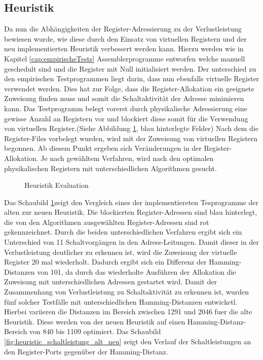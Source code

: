 \subsection{Heuristik}
\label{chap:eval_heuristik}
Da nun die Abhängigkeiten der Register-Adressierung zu der Verlustleistung bewiesen wurde, wie diese durch den Einsatz von virtuellen Registern und der neu implementierten Heuristik verbessert werden kann. Hierzu werden wie in Kapitel \ref{cap:empirischeTests} Assemblerprogramme entworfen welche manuell geschedult sind und die Register mit Null initialisiert werden. Der unterschied zu den empirischen Testprogrammen liegt darin, dass nun ebenfalls virtuelle Register verwendet werden.
Dies hat zur Folge, dass die Register-Allokation ein geeignete Zuweisung finden muss und somit die Schaltaktivität der Adresse minimieren kann. Das Testprogramm belegt vorerst durch physikalische Adressierung eine gewisse Anzahl an Registern vor und blockiert diese somit für die Verwendung von virtuellen Register.(Siehe Abbildung \ref{fig:heuristik_eval}, blau hinterlegte Felder)
Nach dem die Register-Files vorbelegt wurden, wird mit der Zuweisung von virtuellen Registern begonnen. Ab diesem Punkt ergeben sich Veränderungen in der Register-Allokation. Je nach gewähltem Verfahren, wird nach den optimalen physikalischen Registern mit unterschiedlichen Algorithmen gesucht. 

\begin{figure}[H] 
	\centering
	
	\caption{Heuristik Evaluation}
	\label{fig:heuristik_eval}
\end{figure}
Das Schaubild \ref{fig:heuristik_eval}zeigt den Vergleich eines der implementiereten Tesprogramme der alten zur neuen Heuristik. Die blockierten Register-Adressen sind blau hinterlegt, die von den Algorithmen ausgewählten Register-Adressen sind rot gekennzeichnet. Durch die beiden unterschiedlichen Verfahren ergibt sich ein Unterschied von 11 Schaltvorgängen in den Adress-Leitungen. Damit dieser in der Verlustleistung deutlicher zu erkennen ist, wird die Zuweisung der virtuelle Register 20 mal wiederholt. Dadurch ergibt sich ein Differenz der Hamming-Distanzen von 101, da durch das wiederholte Ausführen der Allokation die Zuweisung mit unterschiedlichen Adressen gestartet wird.
Damit der Zusammenhang von Verlustleistung zu Schaltaktivität zu erkennen ist, wurden fünf solcher Testfälle mit unterschiedlichen Hamming-Distanzen entwicketl. Hierbei variieren die Distanzen im Bereich zwischen 1291 und 2046 fuer die alte Heuristik. Diese werden von der neuen Heuristik auf einen Hamming-Distanz-Bereich von 840 bis 1109 optimiert. Das Schaubild \ref{fig:heuristic_schaltleistung_alt_neu} zeigt den Verlauf der Schaltleistungen an den Register-Ports gegenüber der Hamming-Distanz. 

